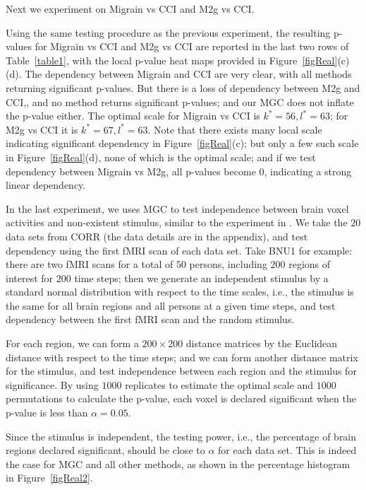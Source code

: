 \documentclass[11pt]{article}
\newcommand{\cs}[1]{{\color{blue}{#1}}}
\begin{document}
Next we experiment on Migrain vs CCI and M2g vs CCI.
\cs{add data description; and feel free to discard M2g vs CCI if necessary.}

Using the same testing procedure as the previous experiment, the resulting p-values for Migrain vs CCI and M2g vs CCI are reported in the last two rows of Table~\ref{table1}, with the local p-value heat maps provided in Figure~\ref{figReal}(c)(d). The dependency between Migrain and CCI are very clear, with all methods returning significant p-values. But there is a loss of dependency between M2g and CCI,, and no method returns significant p-values; and our MGC does not inflate the p-value either. The optimal scale for Migrain vs CCI is $k^{*}=56,l^{*}=63$; for M2g vs CCI it is $k^{*}=67,l^{*}=63$. Note that there exists many local scale indicating significant dependency in Figure~\ref{figReal}(c); but only a few such scale in Figure~\ref{figReal}(d), none of which is the optimal scale; and if we test dependency between Migrain vs M2g, all p-values become $0$, indicating a strong linear dependency.

In the last experiment, we uses MGC to test independence between brain voxel activities and non-existent stimulus, similar to the experiment in \cite{EklundKnutsson2012}. We take the $20$ data sets from CORR (the data details are in the appendix), and test dependency using the first fMRI scan of each data set. Take BNU1 for example: there are two fMRI scans for a total of $50$ persons, including $200$ regions of interest for $200$ time steps; then we generate an independent stimulus by a standard normal distribution with respect to the time scales, i.e., the stimulus is the same for all brain regions and all persons at a given time steps, and test dependency between the first fMRI scan and the random stimulus.

For each region, we can form a $200 \times 200$ distance matrices by the Euclidean distance with respect to the time steps; and we can form another distance matrix for the stimulus, and test independence between each region and the stimulus for significance. By using $1000$ replicates to estimate the optimal scale and $1000$ permutations to calculate the p-value, each voxel is declared significant when the p-value is less than $\alpha=0.05$. 

Since the stimulus is independent, the testing power, i.e., the percentage of brain regions declared significant, should be close to $\alpha$ for each data set. This is indeed the case for MGC and all other methods, as shown in the percentage histogram in Figure~\ref{figReal2}.
\cs{I will add the histogram for mcorr and data details in appendix}
\end{document}
